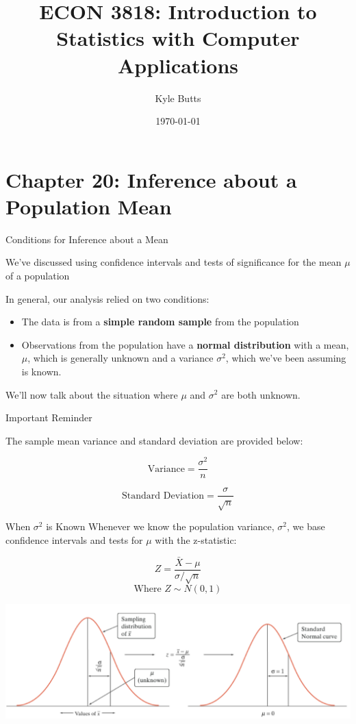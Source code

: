 \documentclass{beamer}
\title{ECON 3818: Introduction to Statistics with Computer Applications}
\date{\today}
\author{Kyle Butts}
\begin{document}
\maketitle


\section{Chapter 20: Inference about a Population Mean}

\begin{frame}{Conditions for Inference about a Mean}
	
	We've discussed using confidence intervals and tests of significance for the mean $\mu$ of a population
	 
	In general, our analysis relied on two conditions:
	\begin{itemize}
		
		\item The data is from a \textbf{simple random sample} from the population
		
		\item Observations from the population have a \textbf{normal distribution} with a mean, $\mu$, which is generally unknown and a variance $\sigma^2$, which we've been assuming is known. 
		
	\end{itemize}
	
	We'll now talk about the situation where $\mu$ and $\sigma^2$ are both unknown.
	
\end{frame}

\begin{frame}{Important Reminder}
	
	The sample mean variance and standard deviation are provided below:

	\[
		\text{Variance} = \frac{\sigma^2}{n}
	\]
	
	\[
		\text{Standard Deviation} = \frac{\sigma}{\sqrt{n}}
	\]
	
\end{frame}

\begin{frame}{When $\sigma^2$ is Known}
	Whenever we know the population variance, $\sigma^2$, we base confidence intervals and tests for $\mu$ with the z-statistic:

	\[
		Z = \frac{\bar{X}-\mu}{\sigma/\sqrt{n}}
	\]
	\[
		\text{Where } Z \sim N(0,1)
	\]

	\includegraphics[width=\textwidth]{standard}
\end{frame}
\end{document}

